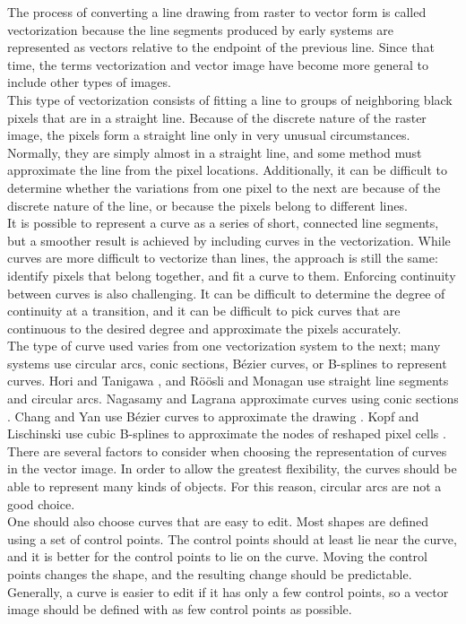 \documentclass[]{usiinfbachelorproject}
\begin{document}
The process of converting a line drawing from raster to vector form is called vectorization because the line segments produced by early systems are represented as vectors relative to the endpoint of the previous line. Since that time, the terms vectorization and vector image have become more general to include other types of images.\\
This type of vectorization consists of fitting a line to groups of neighboring black pixels that are in a straight line. Because of the discrete nature of the raster image, the pixels form a straight line only in very unusual circumstances. Normally, they are simply almost in a straight line, and some method must approximate the line from the pixel locations. Additionally, it can be difficult to determine whether the variations from one pixel to the next are because of the discrete nature of the line, or because the pixels belong to different lines.\\
It is possible to represent a curve as a series of short, connected line segments, but a smoother result is achieved by including curves in the vectorization. While curves are more difficult to vectorize than lines, the approach is still the same: identify pixels that belong together, and fit a curve to them. Enforcing continuity between curves is also challenging. It can be difficult to determine the degree of continuity at a transition, and it can be difficult to pick curves that are continuous to the desired degree and approximate the pixels accurately.\\
The type of curve used varies from one vectorization system to the next; many systems use circular arcs, conic sections, B\'ezier curves, or B-splines to represent curves. Hori and Tanigawa \cite{Hori1993}, and R\"o\"osli and Monagan \cite{Roosli1995} use straight line segments and circular arcs. Nagasamy and Lagrana approximate curves using conic sections \cite{Nagasamy1990}. Chang and Yan use B\'ezier curves to approximate the drawing \cite{Chang1998}. Kopf and Lischinski use cubic B-splines to approximate the nodes of reshaped pixel cells \cite{Kopf2011}.\\
There are several factors to consider when choosing the representation of curves in the vector image. In order to allow the greatest flexibility, the curves should be able to represent many kinds of objects. For this reason, circular arcs are not a good choice.\\
One should also choose curves that are easy to edit. Most shapes are defined using a set of control points. The control points should at least lie near the curve, and it is better for the control points to lie on the curve. Moving the control points changes the shape, and the resulting change should be predictable. Generally, a curve is easier to edit if it has only a few control points, so a vector image should be defined with as few control points as possible.\\
\end{document}
